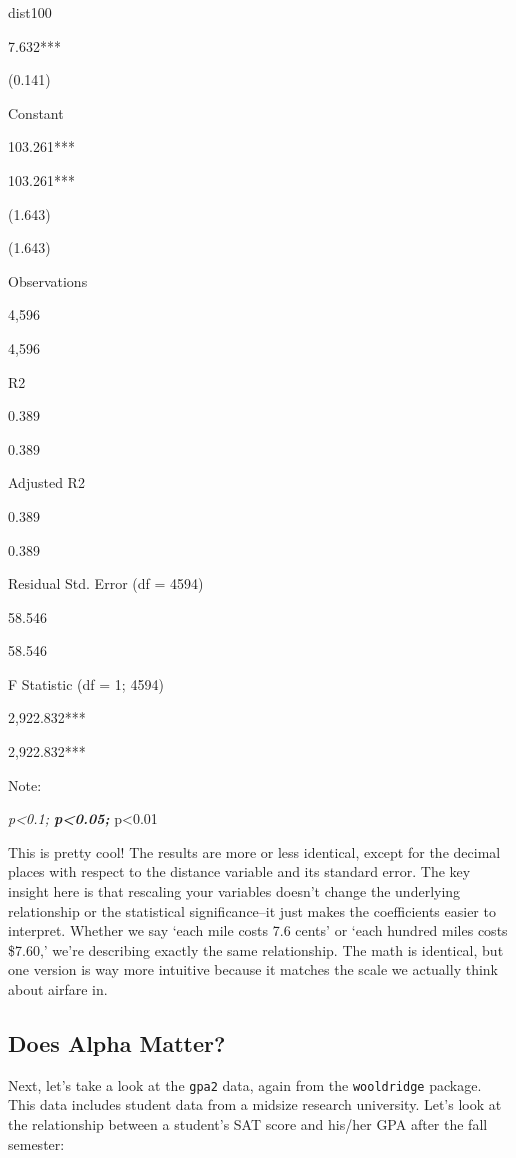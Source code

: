\documentclass[
  letterpaper,
]{book}
\begin{document}
dist100

7.632***

(0.141)

Constant

103.261***

103.261***

(1.643)

(1.643)

Observations

4,596

4,596

R2

0.389

0.389

Adjusted R2

0.389

0.389

Residual Std. Error (df = 4594)

58.546

58.546

F Statistic (df = 1; 4594)

2,922.832***

2,922.832***

Note:

\emph{p\textless0.1; \textbf{p\textless0.05; }}p\textless0.01

This is pretty cool! The results are more or less identical, except for
the decimal places with respect to the distance variable and its
standard error. The key insight here is that rescaling your variables
doesn't change the underlying relationship or the statistical
significance--it just makes the coefficients easier to interpret.
Whether we say `each mile costs 7.6 cents' or `each hundred miles costs
\$7.60,' we're describing exactly the same relationship. The math is
identical, but one version is way more intuitive because it matches the
scale we actually think about airfare in.

\subsection{Does Alpha Matter?}\label{does-alpha-matter}

Next, let's take a look at the \texttt{gpa2} data, again from the
\texttt{wooldridge} package. This data includes student data from a
midsize research university. Let's look at the relationship between a
student's SAT score and his/her GPA after the fall semester:
\end{document}

